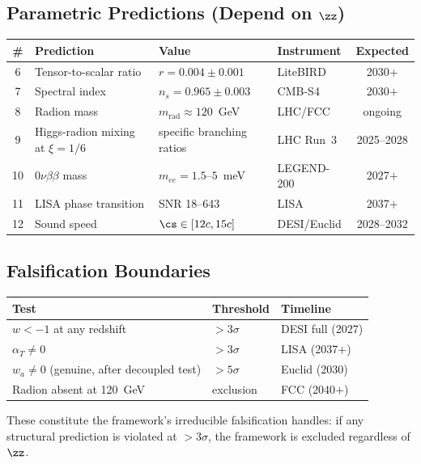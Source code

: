 \subsection*{Parametric Predictions (Depend on $\zz$)}

\begin{center}
\small
\begin{tabular}{@{}c p{4.6cm} p{2.9cm} l c@{}}
\toprule
\textbf{\#} & \textbf{Prediction} & \textbf{Value} & \textbf{Instrument} & \textbf{Expected} \\
\midrule
6  & Tensor-to-scalar ratio & $r = 0.004 \pm 0.001$ & LiteBIRD & 2030$+$ \\
7  & Spectral index & $n_s = 0.965 \pm 0.003$ & CMB-S4 & 2030$+$ \\
8  & Radion mass & $m_{\mathrm{rad}} \approx 120$~GeV & LHC/FCC & ongoing \\
9  & Higgs-radion mixing at $\xi=1/6$ & specific branching ratios & LHC Run~3 & 2025--2028 \\
10 & $0\nu\beta\beta$ mass & $m_{ee} = 1.5$--$5$~meV & LEGEND-200 & 2027$+$ \\
11 & LISA phase transition & SNR 18--643 & LISA & 2037$+$ \\
12 & Sound speed & $\cs \in [12c, 15c]$ & DESI/Euclid & 2028--2032 \\
\bottomrule
\end{tabular}
\end{center}

\subsection*{Falsification Boundaries}

\begin{center}
\small
\begin{tabular}{@{}p{5.5cm} l l@{}}
\toprule
\textbf{Test} & \textbf{Threshold} & \textbf{Timeline} \\
\midrule
$w < -1$ at any redshift & $>3\sigma$ & DESI full (2027) \\
$\alpha_T \neq 0$ & $>3\sigma$ & LISA (2037$+$) \\
$w_a \neq 0$ (genuine, after decoupled test) & $>5\sigma$ & Euclid (2030) \\
Radion absent at 120~GeV & exclusion & FCC (2040$+$) \\
\bottomrule
\end{tabular}
\end{center}

These constitute the framework's irreducible falsification handles: if
any structural prediction is violated at $>3\sigma$, the framework is
excluded regardless of $\zz$.

